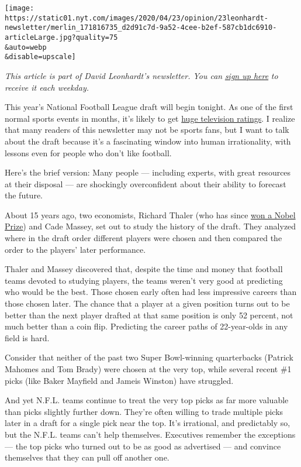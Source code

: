 \texttt{[image: https://static01.nyt.com/images/2020/04/23/opinion/23leonhardt-newsletter/merlin\_171816735\_d2d91c7d-9a52-4cee-b2ef-587cb1dc6910-articleLarge.jpg?quality=75\\\&auto=webp\\\&disable=upscale]}

\emph{This article is part of David Leonhardt's newsletter. You can}
\href{https://www.nytimes.com/newsletters/opiniontoday?action=click\&module=Intentional\&pgtype=Article}{\emph{sign
up here}} \emph{to receive it each weekday.}

This year's National Football League draft will begin tonight. As one of
the first normal sports events in months, it's likely to get
\href{https://www.nytimes.com/2020/04/20/sports/football/nfl-draft-virtual-past.html}{huge
television ratings}. I realize that many readers of this newsletter may
not be sports fans, but I want to talk about the draft because it's a
fascinating window into human irrationality, with lessons even for
people who don't like football.

Here's the brief version: Many people --- including experts, with great
resources at their disposal --- are shockingly overconfident about their
ability to forecast the future.

About 15 years ago, two economists, Richard Thaler (who has since
\href{https://www.nobelprize.org/prizes/economic-sciences/2017/thaler/facts/}{won
a Nobel Prize}) and Cade Massey, set out to study the history of the
draft. They analyzed where in the draft order different players were
chosen and then compared the order to the players' later performance.

Thaler and Massey discovered that, despite the time and money that
football teams devoted to studying players, the teams weren't very good
at predicting who would be the best. Those chosen early often had less
impressive careers than those chosen later. The chance that a player at
a given position turns out to be better than the next player drafted at
that same position is only 52 percent, not much better than a coin flip.
Predicting the career paths of 22-year-olds in any field is hard.

Consider that neither of the past two Super Bowl-winning quarterbacks
(Patrick Mahomes and Tom Brady) were chosen at the very top, while
several recent \#1 picks (like Baker Mayfield and Jameis Winston) have
struggled.

And yet N.F.L. teams continue to treat the very top picks as far more
valuable than picks slightly further down. They're often willing to
trade multiple picks later in a draft for a single pick near the top.
It's irrational, and predictably so, but the N.F.L. teams can't help
themselves. Executives remember the exceptions --- the top picks who
turned out to be as good as advertised --- and convince themselves that
they can pull off another one.

